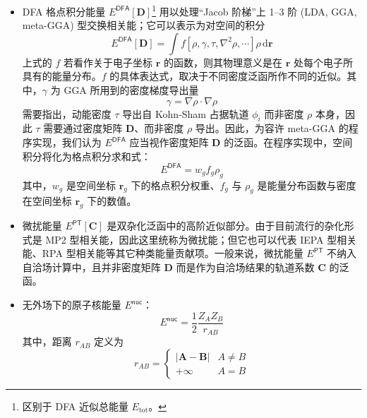 \begin{itemize}[nosep]
  \item DFA 格点积分能量 $E^\textsf{DFA} [\mathbf{D}]$\footnote{区别于 DFA 近似总能量 $E_\mathrm{tot}$。} 用以处理“Jacob 阶梯”上 1--3 阶 (LDA, GGA, meta-GGA) 型交换相关能；它可以表示为对空间的积分
        \begin{equation}
          E^\textsf{DFA} [\mathbf{D}] = \int f[\rho, \gamma, \tau, \nabla^2 \rho, \cdots] \rho \, \mathrm{d} \bm{r}
        \end{equation}
        上式的 $f$ 若看作关于电子坐标 $\bm{r}$ 的函数，则其物理意义是在 $\bm{r}$ 处每个电子所具有的能量分布。$f$ 的具体表达式，取决于不同密度泛函所作不同的近似。其中，$\gamma$ 为 GGA 所用到的密度梯度导出量
        \begin{equation}
          \gamma = \nabla \rho \cdot \nabla \rho
        \end{equation}
        需要指出，动能密度 $\tau$ 导出自 Kohn-Sham 占据轨道 $\phi_i$ 而非密度 $\rho$ 本身，因此 $\tau$ 需要通过密度矩阵 $\mathbf{D}$、而非密度 $\rho$ 导出。因此，为容许 meta-GGA 的程序实现，我们认为 $E^\textsf{DFA}$ 应当视作密度矩阵 $\mathbf{D}$ 的泛函。在程序实现中，空间积分将化为格点积分求和式：
        \begin{equation}
          E^\textsf{DFA} = w_g f_g \rho_g
        \end{equation}
        其中，$w_g$ 是空间坐标 $\bm{r}_g$ 下的格点积分权重、$f_g$ 与 $\rho_g$ 是能量分布函数与密度在空间坐标 $\bm{r}_g$ 下的数值。
  \item 微扰能量 $E^\textsf{PT}[\mathbf{C}]$ 是双杂化泛函中的高阶近似部分。由于目前流行的杂化形式是 MP2 型相关能，因此这里统称为微扰能；但它也可以代表 IEPA 型相关能、RPA 型相关能等其它种类能量贡献项。一般来说，微扰能量 $E^\textsf{PT}$ 不纳入自洽场计算中，且并非密度矩阵 $\mathbf{D}$ 而是作为自洽场结果的轨道系数 $\mathbf{C}$ 的泛函。
  \item 无外场下的原子核能量 $E^\textsf{nuc}$：
        \begin{equation}
          E^\textsf{nuc} = \frac{1}{2} \frac{Z_A Z_B}{r_{AB}}
        \end{equation}
        其中，距离 $r_{AB}$ 定义为
        \begin{equation*}
          r_{AB} =
          \begin{cases}
              | \boldsymbol{A} - \boldsymbol{B} | & A \neq B \\
              + \infty & A = B
          \end{cases}
        \end{equation*}
\end{itemize}

